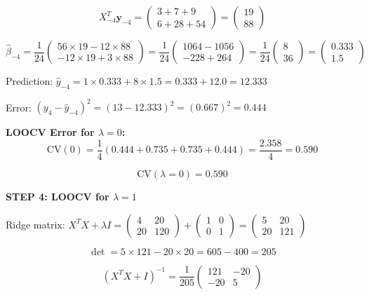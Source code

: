 \documentclass[12pt]{article}
\begin{document}
\begin{solution}
\[X_{-4}^T\mathbf{y}_{-4} = \begin{pmatrix} 3 + 7 + 9 \\ 6 + 28 + 54 \end{pmatrix} = \begin{pmatrix} 19 \\ 88 \end{pmatrix}\]

\[\hat{\beta}_{-4} = \frac{1}{24}\begin{pmatrix} 56 \times 19 - 12 \times 88 \\ -12 \times 19 + 3 \times 88 \end{pmatrix} = \frac{1}{24}\begin{pmatrix} 1064 - 1056 \\ -228 + 264 \end{pmatrix} = \frac{1}{24}\begin{pmatrix} 8 \\ 36 \end{pmatrix} = \begin{pmatrix} 0.333 \\ 1.5 \end{pmatrix}\]

Prediction: $\hat{y}_{-4} = 1 \times 0.333 + 8 \times 1.5 = 0.333 + 12.0 = 12.333$

Error: $(y_4 - \hat{y}_{-4})^2 = (13 - 12.333)^2 = (0.667)^2 = 0.444$

\textbf{LOOCV Error for $\lambda = 0$:}
\[\text{CV}(0) = \frac{1}{4}(0.444 + 0.735 + 0.735 + 0.444) = \frac{2.358}{4} = 0.590\]

\[\boxed{\text{CV}(\lambda = 0) = 0.590}\]

\textbf{STEP 4: LOOCV for $\lambda = 1$}

Ridge matrix: $X^TX + \lambda I = \begin{pmatrix} 4 & 20 \\ 20 & 120 \end{pmatrix} + \begin{pmatrix} 1 & 0 \\ 0 & 1 \end{pmatrix} = \begin{pmatrix} 5 & 20 \\ 20 & 121 \end{pmatrix}$

\[\det = 5 \times 121 - 20 \times 20 = 605 - 400 = 205\]

\[(X^TX + I)^{-1} = \frac{1}{205}\begin{pmatrix} 121 & -20 \\ -20 & 5 \end{pmatrix}\]


\end{solution}
\end{document}
